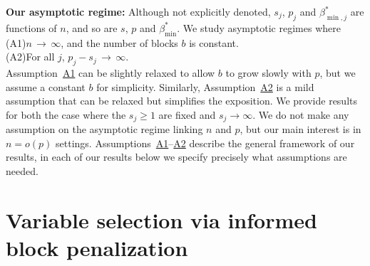 \documentclass[bj,authoryear]{imsart}
\theoremstyle{plain}
\begin{document}
\noindent\textbf{Our asymptotic regime:} Although not explicitly denoted, $s_j$, $p_j$ and $\beta_{\min,j}^*$ are functions of $n$, and so are $s$, $p$ and $\beta_{\min}^*$. We study asymptotic regimes where \\[5pt]
     \hypertarget{lab:A1}{(A1)}\quad $n \,\to \, \infty$, and the number of blocks $b$ is constant. \\[5pt]
     \hypertarget{lab:A2}{(A2)}\quad For all $j$, $p_j-s_j \,\to \, \infty$.\\[5pt]
Assumption~\hyperlink{lab:A1}{A1} can be slightly relaxed to allow $b$ to grow slowly with $p$, but we assume a constant $b$ for simplicity.
Similarly, Assumption~\hyperlink{lab:A2}{A2} is a mild assumption that can be relaxed but simplifies the exposition. We provide results for both the case where the $s_j\geq1$ are fixed and $s_j \rightarrow \infty$. We do not make any assumption on the asymptotic regime linking $n$ and $p$, but our main interest is in $n= o(p)$ settings. Assumptions~\hyperlink{lab:A1}{A1}--\hyperlink{lab:A2}{A2} describe the general framework of our results, in each of our results below we specify precisely what %
assumptions are needed.

\section{Variable selection via informed block penalization}\label{sec:intro_blockpen}
\end{document}
